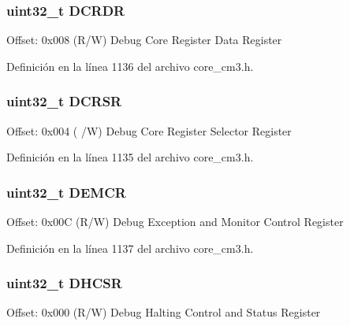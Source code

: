 \subsubsection[{\texorpdfstring{D\+C\+R\+DR}{DCRDR}}]{ uint32\+\_\+t D\+C\+R\+DR}\hypertarget{struct_core_debug___type_a5bcffe99d1d5471d5e5befbc6272ebf0}{}\label{struct_core_debug___type_a5bcffe99d1d5471d5e5befbc6272ebf0}
Offset\+: 0x008 (R/W) Debug Core Register Data Register 

Definición en la línea 1136 del archivo core\+\_\+cm3.\+h.

\subsubsection[{\texorpdfstring{D\+C\+R\+SR}{DCRSR}}]{ uint32\+\_\+t D\+C\+R\+SR}\hypertarget{struct_core_debug___type_a7b49cb58573da77cc8a83a1b21262180}{}\label{struct_core_debug___type_a7b49cb58573da77cc8a83a1b21262180}
Offset\+: 0x004 ( /W) Debug Core Register Selector Register 

Definición en la línea 1135 del archivo core\+\_\+cm3.\+h.

\subsubsection[{\texorpdfstring{D\+E\+M\+CR}{DEMCR}}]{ uint32\+\_\+t D\+E\+M\+CR}\hypertarget{struct_core_debug___type_a6cdfc0a6ce3e988cc02c2d6e8107d193}{}\label{struct_core_debug___type_a6cdfc0a6ce3e988cc02c2d6e8107d193}
Offset\+: 0x00C (R/W) Debug Exception and Monitor Control Register 

Definición en la línea 1137 del archivo core\+\_\+cm3.\+h.

\subsubsection[{\texorpdfstring{D\+H\+C\+SR}{DHCSR}}]{ uint32\+\_\+t D\+H\+C\+SR}\hypertarget{struct_core_debug___type_a39bc5e68dc6071187fbe2348891eabfa}{}\label{struct_core_debug___type_a39bc5e68dc6071187fbe2348891eabfa}
Offset\+: 0x000 (R/W) Debug Halting Control and Status Register 

